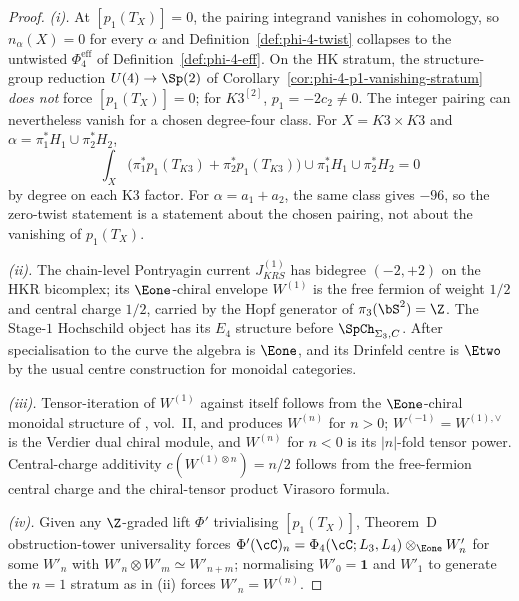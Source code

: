 \begin{proof}
\emph{(i).} At $[p_1(T_X)] = 0$, the pairing integrand vanishes in
cohomology, so \(n_\alpha(X)=0\) for every \(\alpha\) and
Definition~\ref{def:phi-4-twist} collapses to the untwisted
$\Phi_4^{\mathrm{eff}}$ of Definition~\ref{def:phi-4-eff}. On the HK
stratum, the structure-group reduction $U(4) \to \Sp(2)$ of
Corollary~\ref{cor:phi-4-p1-vanishing-stratum} \emph{does not} force
$[p_1(T_X)] = 0$; for \(K3^{[2]}\), \(p_1=-2c_2\neq0\). The integer
pairing can nevertheless vanish for a chosen degree-four class. For
\(X=K3\times K3\) and
\(\alpha=\pi_1^*H_1\cup\pi_2^*H_2\),
\[
 \int_X\bigl(\pi_1^*p_1(T_{K3})+\pi_2^*p_1(T_{K3})\bigr)
 \cup \pi_1^*H_1\cup\pi_2^*H_2=0
\]
by degree on each K3 factor. For \(\alpha=a_1+a_2\), the same class gives
\(-96\), so the zero-twist statement is a statement about the chosen
pairing, not about the vanishing of \(p_1(T_X)\).

\emph{(ii).} The chain-level Pontryagin current $J^{(1)}_{KRS}$ has bidegree
$(-2, +2)$ on the HKR bicomplex; its $\Eone$-chiral envelope $W^{(1)}$
is the free fermion of weight $1/2$ and central charge $1/2$, carried by
the Hopf generator of $\pi_3(\bS^2) = \Z$. The Stage-$1$ Hochschild
object has its $E_4$ structure before $\SpCh_{\Sigma_3,C}$. After
specialisation to the curve the algebra is $\Eone$, and its Drinfeld
centre is $\Etwo$ by the usual centre construction for monoidal
categories.

\emph{(iii).} Tensor-iteration of $W^{(1)}$ against itself follows from the
$\Eone$-chiral monoidal structure of \cite{CostelloGwilliam}, vol.\ II, and
produces $W^{(n)}$ for $n > 0$; $W^{(-1)} = W^{(1),\vee}$ is the Verdier
dual chiral module, and $W^{(n)}$ for $n < 0$ is its $|n|$-fold tensor
power. Central-charge additivity $c(W^{(1)\otimes n}) = n/2$ follows from
the free-fermion central charge and the chiral-tensor product Virasoro
formula.

\emph{(iv).} Given any $\Z$-graded lift $\Phi'$ trivialising
$[p_1(T_X)]$, Theorem~D obstruction-tower universality forces
	\(\Phi'(\cC)_n=\Phi_4(\cC;L_3,L_4)\otimes_{\Eone}W'_n\) for some \(W'_n\) with
$W'_n \otimes W'_m \simeq W'_{n+m}$; normalising $W'_0 = \mathbf{1}$ and
$W'_1$ to generate the $n = 1$ stratum as in (ii) forces $W'_n = W^{(n)}$.
\end{proof}


